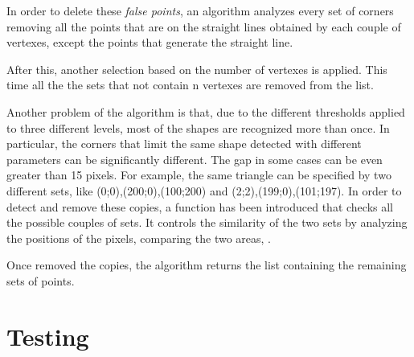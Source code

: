 		In order to delete these \emph{false points}, an algorithm analyzes every set of corners removing all the points that are on the straight lines obtained by each couple of vertexes, except the points that generate the straight line. 
		
		After this, another selection based on the number of vertexes is applied. This time all the the sets that not contain n vertexes are removed from the list.
		
		 
				
		
		Another problem of the algorithm is that, due to the different thresholds applied to three different levels, most of the shapes are recognized more than once.
		In particular, the corners that limit the same shape detected with different parameters can be significantly different.  
		The gap in some cases can be even greater than 15 pixels. 
		For example, the same triangle can be specified by two different sets, like {(0;0),(200;0),(100;200)} and {(2;2),(199;0),(101;197)}. 
		In order to detect and remove these copies, a function  has been introduced that checks all the possible couples of sets. 
		It controls the similarity of the two sets by analyzing the positions of the pixels, comparing the two areas, .
		
		Once removed the copies, the algorithm returns the list containing the remaining sets of points.

\begin{comment}		
		various parameters like the positions of pixels, the areas and the positions of each couple of 
	
		Then, the corners of each shape are "uniti" thanks to an algorithm of fi
		
		In order to detect the douls
\end{comment}
	

	

	\section{Testing}


